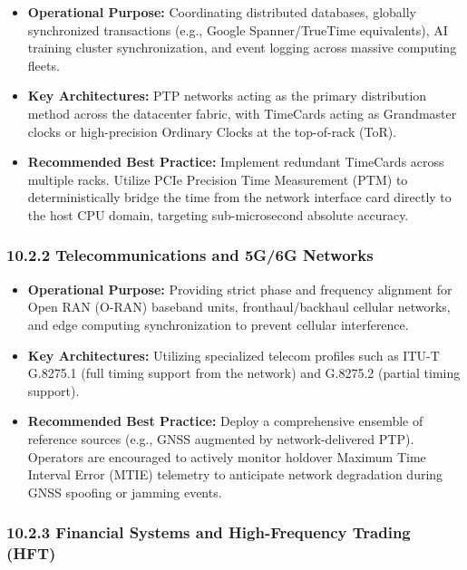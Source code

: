 \documentclass[
]{article}
\begin{document}
\begin{itemize}
\item
  \textbf{Operational Purpose:} Coordinating distributed databases,
  globally synchronized transactions (e.g., Google Spanner/TrueTime
  equivalents), AI training cluster synchronization, and event logging
  across massive computing fleets.
\item
  \textbf{Key Architectures:} PTP networks acting as the primary
  distribution method across the datacenter fabric, with TimeCards
  acting as Grandmaster clocks or high-precision Ordinary Clocks at the
  top-of-rack (ToR).
\item
  \textbf{Recommended Best Practice:} Implement redundant TimeCards
  across multiple racks. Utilize PCIe Precision Time Measurement (PTM)
  to deterministically bridge the time from the network interface card
  directly to the host CPU domain, targeting sub-microsecond absolute
  accuracy.
\end{itemize}

\subsubsection{10.2.2 Telecommunications and 5G/6G
Networks}\label{telecommunications-and-5g6g-networks}

\begin{itemize}
\item
  \textbf{Operational Purpose:} Providing strict phase and frequency
  alignment for Open RAN (O-RAN) baseband units, fronthaul/backhaul
  cellular networks, and edge computing synchronization to prevent
  cellular interference.
\item
  \textbf{Key Architectures:} Utilizing specialized telecom profiles
  such as ITU-T G.8275.1 (full timing support from the network) and
  G.8275.2 (partial timing support).
\item
  \textbf{Recommended Best Practice:} Deploy a comprehensive ensemble of
  reference sources (e.g., GNSS augmented by network-delivered PTP).
  Operators are encouraged to actively monitor holdover Maximum Time
  Interval Error (MTIE) telemetry to anticipate network degradation
  during GNSS spoofing or jamming events.
\end{itemize}

\subsubsection{10.2.3 Financial Systems and High-Frequency Trading
(HFT)}\label{financial-systems-and-high-frequency-trading-hft}
\end{document}
